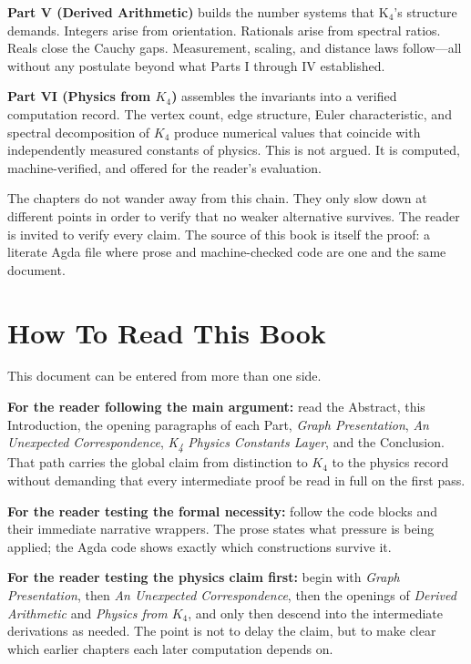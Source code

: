 \documentclass[11pt,a4paper]{book}
\begin{document}
\textbf{Part V (Derived Arithmetic)} builds the number systems that K$_4$'s structure demands. Integers arise from orientation. Rationals arise from spectral ratios. Reals close the Cauchy gaps. Measurement, scaling, and distance laws follow---all without any postulate beyond what Parts I through IV established.

\textbf{Part VI (Physics from $K_4$)} assembles the invariants into a verified computation record. The vertex count, edge structure, Euler characteristic, and spectral decomposition of $K_4$ produce numerical values that coincide with independently measured constants of physics. This is not argued. It is computed, machine-verified, and offered for the reader's evaluation.

The chapters do not wander away from this chain. They only slow down at different points in order to verify that no weaker alternative survives. The reader is invited to verify every claim. The source of this book is itself the proof: a literate Agda file where prose and machine-checked code are one and the same document.

\section{How To Read This Book}

This document can be entered from more than one side.

\textbf{For the reader following the main argument:} read the Abstract, this Introduction, the opening paragraphs of each Part, \emph{Graph Presentation}, \emph{An Unexpected Correspondence}, \emph{K\textsubscript{4} Physics Constants Layer}, and the Conclusion. That path carries the global claim from distinction to $K_4$ to the physics record without demanding that every intermediate proof be read in full on the first pass.

\textbf{For the reader testing the formal necessity:} follow the code blocks and their immediate narrative wrappers. The prose states what pressure is being applied; the Agda code shows exactly which constructions survive it.

\textbf{For the reader testing the physics claim first:} begin with \emph{Graph Presentation}, then \emph{An Unexpected Correspondence}, then the openings of \emph{Derived Arithmetic} and \emph{Physics from $K_4$}, and only then descend into the intermediate derivations as needed. The point is not to delay the claim, but to make clear which earlier chapters each later computation depends on.
\end{document}
